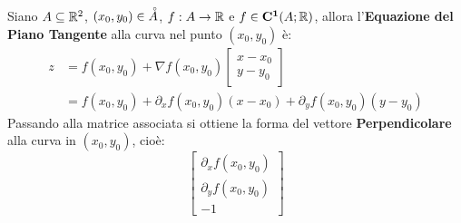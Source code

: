 \begin{definition}
	Siano $A \subseteq \mathbb{R}^2$, $(x_0, y_0) \in \accentset{\circ}{A}$, $f: A \to \mathbb{R}$ e $f \in \mathbf{C^{1}}(A; \mathbb{R})$, allora l'\textbf{Equazione del Piano Tangente} alla curva nel punto $(x_0, y_0)$ è:
	\begin{align*}
		z &= f(x_0, y_0) + \nabla f(x_0, y_0) \begin{bmatrix}x - x_0\\y - y_0\end{bmatrix}\\
		&= f(x_0, y_0) + \partial_x f(x_0, y_0) (x - x_0) + \partial_y f(x_0, y_0) (y - y_0)
	\end{align*}
	Passando alla matrice associata si ottiene la forma del vettore \textbf{Perpendicolare} alla curva in $(x_0, y_0)$, cioè:
	\[
		\begin{bmatrix}
			\partial_x f(x_0, y_0)\\
			\partial_y f(x_0, y_0)\\
			-1
		\end{bmatrix}
	\]
\end{definition}

